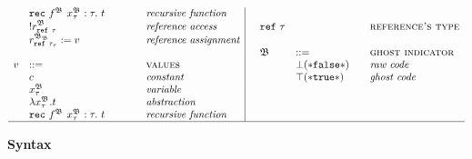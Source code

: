 \begin{figure}[H]
\begin{adjustwidth}{-6em}{-4em}
\begin{displaymath}
\begin{array}{ll@{\hspace*{-0.1cm}}
							 l@{\hspace*{1.5cm} }
							 l|@{\hspace*{0.5cm}}
							 llll}
  &	\glrec
  & &  \textit{recursive function}
  & & & & \\
   	   		
   	   								      								   
  &  	\glread
  & &  \textit{reference access} &
  \mathtt{ref}~\tau  &
	& & \textsc{reference's type}  \\      					
 	   
	&  	\gwrite{r}{B}{\tau}{v} 
	& &  \textit{reference assignment} & \\
	
	& & & & \mf{B} & ::= 
  & & \textsc{ghost indicator} \\
	
	{v} & ::= & & \textsc{values} &
	& \bot \mathtt{(* false *)} 
  & & \textit{raw code} \\ 
	
	
	&   c
  & & \textit{constant} & 
  
  & \top \mathtt{(* true *)} 
  & & \textit{ghost code} \\ 



	&		\glvar
	& & \textit{variable} & \\
	

	
  &   \glabst
  & & \textit{abstraction} &	\\
	
	
	
	
	&   \glrec
  & & \textit{recursive function} &	\\
	
 \hline						   
  \end{array} 
\end{displaymath} 

\caption{ \textbf{\gml Syntax} \hfill}
\label{gml-syntax}
\end{adjustwidth}
\end{figure}
\newpage